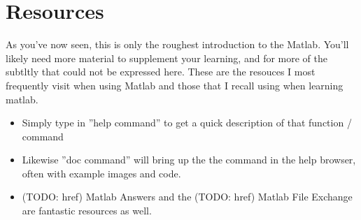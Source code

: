 
\pagebreak
\section{Resources}
As you've now seen, this is only the roughest introduction to the Matlab.
 You'll likely need more material to supplement your learning, and for more of the subtltly that could not be expressed here.
 These are the resouces I most frequently visit when using Matlab and those that I recall using when learning matlab.

\begin{itemize}
 \item Simply type in ''help command'' to get a quick description of that function / command
 \item Likewise ''doc command'' will bring up the the command in the help browser, often with example images and code.
 \item (TODO: href) Matlab Answers and the (TODO: href) Matlab File Exchange are fantastic resources as well.
\end{itemize}
